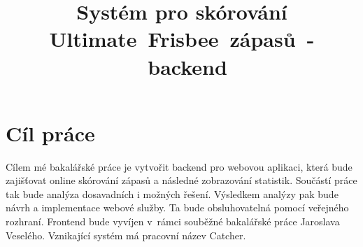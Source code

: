 \documentclass[thesis=B,czech]{FITthesis}[2012/06/26]
\title{Systém pro skórování Ultimate~Frisbee~zápasů~-~backend}
\begin{document}
 
 
 
 \begin{introduction}
 \end{introduction}
 
 \chapter{Cíl práce}
 
 Cílem mé bakalářské práce je vytvořit backend pro webovou aplikaci, která bude zajišťovat online
 skórování zápasů a následné zobrazování statistik. Sou\-částí práce tak bude analýza dosavadních
 i možných řešení. Výsledkem analýzy pak bude návrh a implementace webové služby. Ta bude obsluhovatelná
 pomocí veřejného rozhraní. Frontend bude vyvíjen v~rámci souběžné bakalářské práce Jaroslava Veselého.
 Vznikající systém má pracovní název Catcher.

 

 

 










\begin{conclusion}
\end{conclusion}

%
%
%



\appendix
% 
\end{document}
